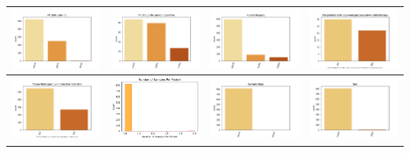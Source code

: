 \begin{center}
\begin{tabular}{ |c|c|c|c| }
		\\  \hline    
		\includegraphics[width=.25\textwidth]{NOTEBOOK/IMAGENES_CRUDAS/93} 
		& \includegraphics[width=.25\textwidth]{NOTEBOOK/IMAGENES_CRUDAS/94} 
		& \includegraphics[width=.25\textwidth]{NOTEBOOK/IMAGENES_CRUDAS/95} 
		& \includegraphics[width=.25\textwidth]{NOTEBOOK/IMAGENES_CRUDAS/96}   
		\\  \hline     
		\includegraphics[width=.22\textwidth]{NOTEBOOK/IMAGENES_CRUDAS/97} 
		& \includegraphics[width=.25\textwidth]{NOTEBOOK/IMAGENES_CRUDAS/98}
		& \includegraphics[width=.25\textwidth]{NOTEBOOK/IMAGENES_CRUDAS/99}
		& \includegraphics[width=.25\textwidth]{NOTEBOOK/IMAGENES_CRUDAS/100} 

\end{tabular}
\end{center}
